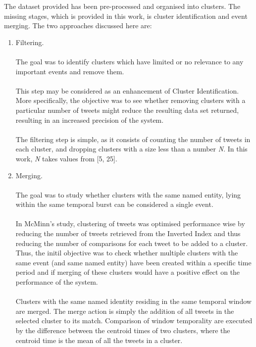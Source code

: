 \documentclass[a4paper,portrait,12pt]{article}
\begin{document}
The dataset provided has been pre-processed and organised into clusters.
The missing stages, which is provided in this work, is cluster identification and event merging.
The two approaches discussed here are:
\begin{enumerate}
	\item Filtering.\\
	      \\
	      The goal was to identify clusters which have limited or no relevance to any important events and remove them.\\
	      \\
	      This step may be considered as an enhancement of Cluster Identification.
	      More specifically, the objective was to see whether removing clusters with a particular number of tweets might reduce the resulting data set returned, resulting in an increased precision of the system. \\
	      \\
	      The filtering step is simple, as it consists of counting the number of tweets in each cluster, and dropping clusters with a size less than a number \textit{N}.
	      In this work, \textit{N} takes values from [5, 25].
	\item Merging. \\
	      \\
	      The goal was to study whether clusters with the same named entity, lying within the same temporal burst can be considered a single event. \\
	      \\
	      In McMinn's study, clustering of tweets was optimised performance wise by reducing the number of tweets retrieved from the Inverted Index and thus reducing the number of comparisons for each tweet to be added to a cluster.
	      Thus, the initil objective was to check whether multiple clusters with the same event (and same named entity) have been created within a specific time period and if merging of these clusters would have a positive effect on the performance of the system.\\
	      \\
	      Clusters with the same named identity residing in the same temporal window are merged.
	      The merge action is simply the addition of all tweets in the selected cluster to its match.
	      Comparison of window temporality are executed by the difference between the centroid times of two clusters, where the centroid time is the mean of all the tweets in a cluster.\\


\end{enumerate}
\end{document}
